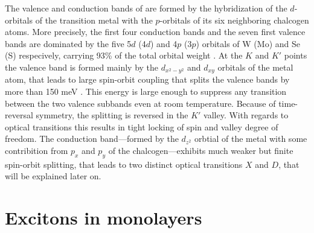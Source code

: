The valence and conduction bands of \tmds are formed by the hybridization of the $d$-orbitals of the transition metal with the $p$-orbitals of its six neighboring chalcogen atoms. More precisely, the first four conduction bands and the seven first valence bands are dominated by the five 5$d$ (4$d$) and 4$p$ (3$p$) orbitals of W (Mo) and Se (S) respecively, carrying 93\% of the total orbital weight \cite{cappelluti_tight-binding_2013,silva-guillen_electronic_2016}. At the $K$ and $K'$ points the valence band is formed mainly by the $d_{x^2-y^2}$ and $d_{xy}$ orbitals of the metal atom, that leads to large spin-orbit coupling that splits the valence bands by more than 150 meV  \cite{zhu_giant_2011}. This energy is large enough to suppress any transition between the two valence subbands even at room temperature. Because of time-reversal symmetry, the splitting is reversed in the $K'$ valley. With regards to optical transitions this results in tight locking of spin and valley degree of freedom. The conduction band---formed by the $d_{z^2}$ orbtial of the metal with some contribition from $p_x$ and $p_y$ of the chalcogen---exhibits much weaker but finite spin-orbit splitting, that leads to two distinct optical transitions $X$ and $D$, that will be explained later on.

\section{Excitons in \tmdg monolayers}\label{theory_exciton}

